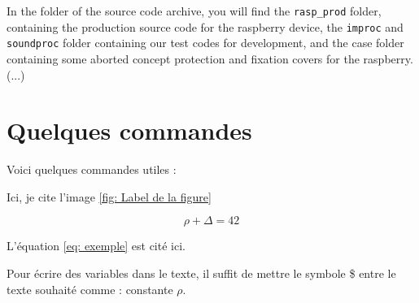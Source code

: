 \documentclass{rapport}
\begin{document}
In the folder of the source code archive, you will find the \verb|rasp_prod| folder, containing the production source code for the raspberry device, the \verb|improc| and \verb|soundproc| folder containing our test codes for development, and the case folder containing some aborted concept protection and fixation covers for the raspberry. (...)


\section{Quelques commandes}

Voici quelques commandes utiles :


Ici, je cite l'image \ref{fig: Label de la figure}



\begin{equation} \label{eq: exemple}
\rho + \Delta = 42
\end{equation}

L'équation \ref{eq: exemple} est cité ici. 


Pour écrire des variables dans le texte, il suffit de mettre le symbole \$ entre le texte souhaité comme : constante $\rho$. 
\end{document}

